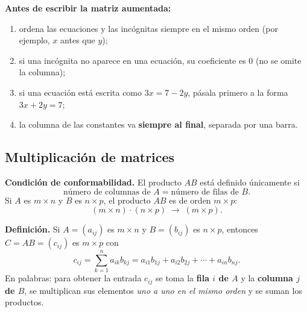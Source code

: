 \documentclass[12pt, letterpaper]{article}
\begin{document}
\begin{cuadroadvertencia}
  \small
  \textbf{Antes de escribir la matriz aumentada:}
  \begin{enumerate}[leftmargin=1.4em, nosep]
    \item ordena las ecuaciones y las incógnitas siempre en el mismo orden
          (por ejemplo, $x$ antes que $y$);
    \item si una incógnita no aparece en una ecuación, su coeficiente es
          $0$ (no se omite la columna);
    \item si una ecuación está escrita como $3x=7-2y$, pásala primero a la
          forma $3x+2y=7$;
    \item la columna de las constantes va \textbf{siempre al final}, separada
          por una barra.
  \end{enumerate}
\end{cuadroadvertencia}

\subsection{Multiplicación de matrices}

\begin{cuadroteoria}
  \small
  \textbf{Condición de conformabilidad.} El producto $AB$ está definido
  únicamente si
  \[
    \text{número de columnas de }A
    =
    \text{número de filas de }B.
  \]
  Si $A$ es $m\times n$ y $B$ es $n\times p$, el producto $AB$ es de orden
  $m\times p$:
  \[
    (m\times n)\cdot(n\times p)\;\longrightarrow\;(m\times p).
  \]
\end{cuadroteoria}

\begin{cuadroteoria}
  \small
  \textbf{Definición.} Si $A=(a_{ij})$ es $m\times n$ y $B=(b_{ij})$ es
  $n\times p$, entonces $C=AB=(c_{ij})$ es $m\times p$ con
  \[
    c_{ij}=\sum_{k=1}^{n}a_{ik}b_{kj}
    =a_{i1}b_{1j}+a_{i2}b_{2j}+\cdots+a_{in}b_{nj}.
  \]
  En palabras: para obtener la entrada $c_{ij}$ se toma la \textbf{fila $i$
  de $A$} y la \textbf{columna $j$ de $B$}, se multiplican sus elementos
  \emph{uno a uno en el mismo orden} y se suman los productos.
\end{cuadroteoria}
\end{document}
